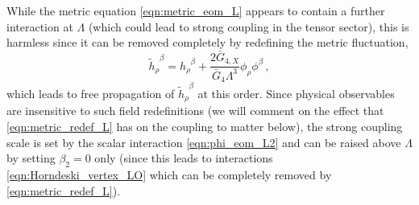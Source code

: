 \documentclass[11pt]{article}
\begin{document}
While the metric equation \eqref{eqn:metric_eom_L} appears to contain a further interaction  
at $\Lambda$ (which could lead to strong coupling in the tensor sector), this is harmless since it can be removed completely by redefining the metric fluctuation,
\begin{equation}
\tilde{h}_{\rho}^{\;\; \beta} = h_{\rho}^{\;\; \beta} + \frac{2 \bar{G}_{4,X} }{ \bar{G}_4 \Lambda^3} \phi_\rho \phi^\beta \, ,
 \label{eqn:metric_redef_L}
\end{equation}
which leads to free propagation of $\tilde{h}_\rho^{\;\; \beta}$ at this order. 
Since physical observables are insensitive to such field redefinitions (we will comment on the effect that \eqref{eqn:metric_redef_L} has on the coupling to matter below), the strong coupling scale is set by the scalar interaction \eqref{eqn:phi_eom_L2} and can be raised above $\Lambda$ by setting $\beta_2 = 0$ only (since this leads to interactions \eqref{eqn:Horndeski_vertex_LO} which can be completely removed by \eqref{eqn:metric_redef_L}).  


\end{document}
